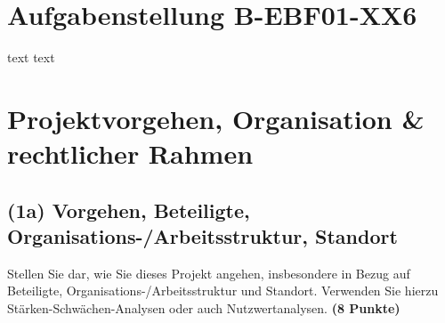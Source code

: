 \documentclass[
%
ngerman %
%
numeric %
]{wbh-assignment}
\begin{document}

\onehalfspacing
{}
\tableofcontents %
\cleardoublepage


\renewcommand{\sectionmark}[1]{\markright{#1}}
\renewcommand{\subsectionmark}[1]{}
\renewcommand{\subsubsectionmark}[1]{}

\onehalfspacing
\renewcommand{\thesection}{\arabic{section}}
\renewcommand{\theHsection}{\arabic{section}}
\setcounter{section}{0}

\section*{Aufgabenstellung B-EBF01-XX6}
text
\cleardoublepage
text
\cleardoublepage

\section{Projektvorgehen, Organisation \& rechtlicher Rahmen}
\label{sec:projektvorgehen}

\subsection{(1a) Vorgehen, Beteiligte, Organisations-/Arbeitsstruktur, Standort}
\begin{aufgabenstellung}
Stellen Sie dar, wie Sie dieses Projekt angehen, insbesondere in Bezug auf Beteiligte, Organisations-/Arbeitsstruktur und Standort. Verwenden Sie hierzu Stärken-Schwächen-Analysen oder auch Nutzwertanalysen. \textbf{(8 Punkte)}
\end{aufgabenstellung}
\end{document}
